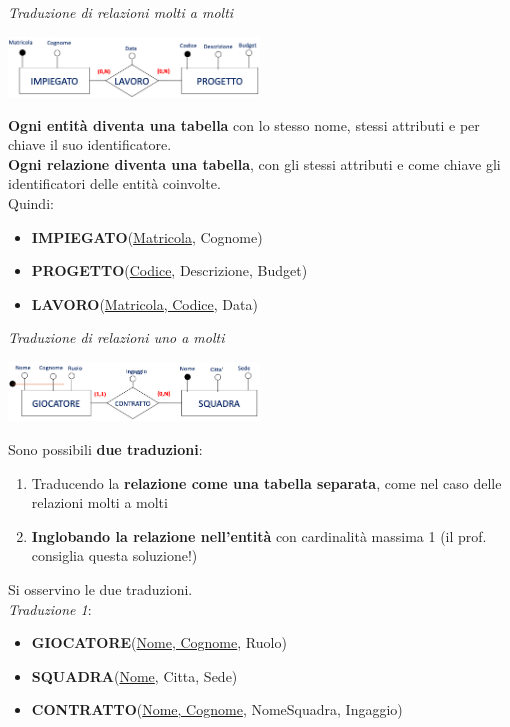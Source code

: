 \documentclass{article}
\begin{document}
\textit{Traduzione di relazioni molti a molti}\\
\begin{center}
    \includegraphics[width=0.5\textwidth]{foto 16.png}
\end{center}
\textbf{Ogni entità diventa una tabella} con lo stesso nome, stessi attributi e per chiave il suo identificatore.\\
\textbf{Ogni relazione diventa una tabella}, con gli stessi attributi e come chiave gli identificatori delle entità coinvolte.\\
Quindi:
\begin{itemize}[label={ }, leftmargin=1cm]
    \item \textbf{IMPIEGATO}(\underline{Matricola}, Cognome)
    \item \textbf{PROGETTO}(\underline{Codice}, Descrizione, Budget)
    \item \textbf{LAVORO}(\underline{Matricola, Codice}, Data)\\
\end{itemize}
\textit{Traduzione di relazioni uno a molti}\\
\begin{center}
    \includegraphics[width=0.5\textwidth]{foto 17.png}
\end{center}
Sono possibili \textbf{due traduzioni}:
\begin{enumerate}[leftmargin=1cm]
    \item Traducendo la \textbf{relazione come una tabella separata}, come nel caso delle relazioni molti a molti
    \item \textbf{Inglobando la relazione nell'entità} con cardinalità massima 1 (il prof. consiglia questa soluzione!)
\end{enumerate}
Si osservino le due traduzioni.\\
\textit{Traduzione 1}:
\begin{itemize}[label={ }, leftmargin=1cm]
    \item \textbf{GIOCATORE}(\underline{Nome, Cognome}, Ruolo)
    \item \textbf{SQUADRA}(\underline{Nome}, Citta, Sede)
    \item \textbf{CONTRATTO}(\underline{Nome, Cognome}, NomeSquadra, Ingaggio)
\end{itemize}
\end{document}
